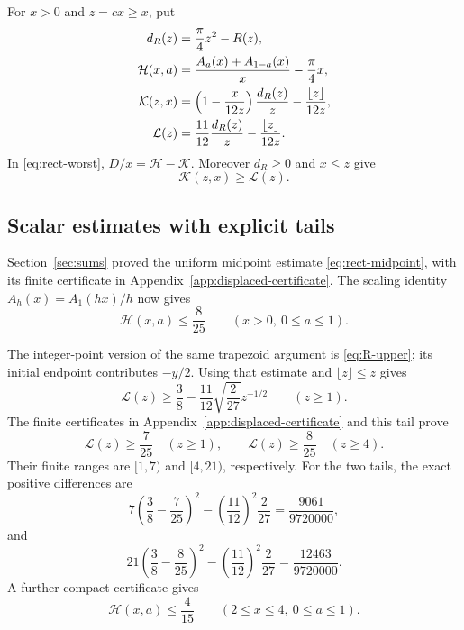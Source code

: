 \documentclass[11pt,reqno]{amsart}
\numberwithin{equation}{section}
\begin{document}
For $x>0$ and $z=cx\ge x$, put
\begin{align}
 d_R(z)&=\frac\pi4z^2-R(z),\notag\\
 \mathcal H(x,a)&=\frac{A_a(x)+A_{1-a}(x)}x-\frac\pi4x,
       \label{eq:rect-HKL}\\
 \mathcal K(z,x)&=\left(1-\frac{x}{12z}\right)\frac{d_R(z)}z
                     -\frac{\lfloor z\rfloor}{12z},\notag\\
 \mathcal L(z)&=\frac{11}{12}\frac{d_R(z)}z
                     -\frac{\lfloor z\rfloor}{12z}.\notag
\end{align}
In \eqref{eq:rect-worst}, $D/x=\mathcal H-\mathcal K$.
Moreover $d_R\ge0$ and $x\le z$ give
\begin{equation}\label{eq:rect-KL}
 \mathcal K(z,x)\ge\mathcal L(z).
\end{equation}

\subsection*{Scalar estimates with explicit tails}

Section~\ref{sec:sums} proved the uniform midpoint estimate
\eqref{eq:rect-midpoint}, with its finite certificate in
Appendix~\ref{app:displaced-certificate}.
The scaling identity $A_h(x)=A_1(hx)/h$ now gives
\begin{equation}\label{eq:rect-H-global}
 \mathcal H(x,a)\le\frac8{25}\qquad(x>0,\ 0\le a\le1).
\end{equation}

The integer-point version of the same trapezoid argument is
\eqref{eq:R-upper}; its initial endpoint contributes $-y/2$.
Using that estimate and $\lfloor z\rfloor\le z$ gives
\begin{equation}\label{eq:rect-L-tail}
 \mathcal L(z)\ge\frac38-\frac{11}{12}\sqrt{\frac2{27}}z^{-1/2}
 \qquad(z\ge1).
\end{equation}
The finite certificates in Appendix~\ref{app:displaced-certificate}
and this tail prove
\begin{equation}\label{eq:rect-L-bounds}
 \mathcal L(z)\ge\frac7{25}\quad(z\ge1),\qquad
 \mathcal L(z)\ge\frac8{25}\quad(z\ge4).
\end{equation}
Their finite ranges are $[1,7)$ and $[4,21)$, respectively.
For the two tails, the exact positive differences are
\[
 7\left(\frac38-\frac7{25}\right)^2
 -\left(\frac{11}{12}\right)^2\frac2{27}
 =\frac{9061}{9720000},
\]
and
\[
 21\left(\frac38-\frac8{25}\right)^2
 -\left(\frac{11}{12}\right)^2\frac2{27}
 =\frac{12463}{9720000}.
\]
A further compact certificate gives
\begin{equation}\label{eq:rect-H-middle}
 \mathcal H(x,a)\le\frac4{15}
 \qquad(2\le x\le4,\ 0\le a\le1).
\end{equation}
\end{document}
